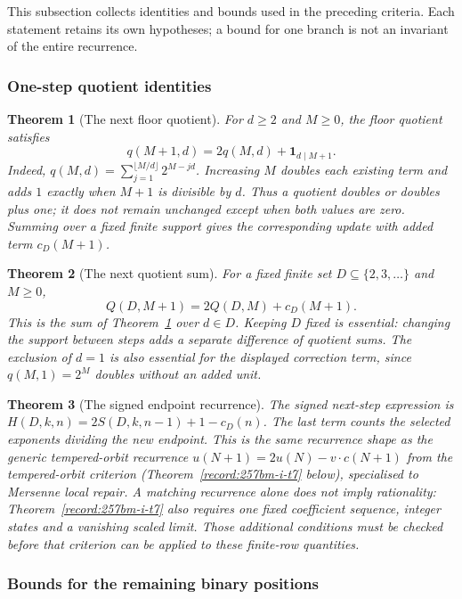 \documentclass[11pt]{article}
\theoremstyle{plain}
\newtheorem{thm}{Theorem}[section]
\theoremstyle{definition}
\theoremstyle{remark}
\begin{document}
This subsection collects identities and bounds used in the preceding
criteria.  Each statement retains its own hypotheses; a bound for one
branch is not an invariant of the entire recurrence.

\subsubsection*{One-step quotient identities}

\begin{thm}[The next floor quotient]\label{record:257bm-i1a}
For $d\ge2$ and $M\ge0$, the floor quotient satisfies
\[
 q(M+1,d)=2q(M,d)+\mathbf1_{d\mid M+1}.
\]
Indeed, $q(M,d)=\sum_{j=1}^{\lfloor M/d\rfloor}2^{M-jd}$.
Increasing $M$ doubles each existing term and adds $1$ exactly when
$M+1$ is divisible by $d$.  Thus a quotient doubles or doubles plus
one; it does not remain unchanged except when both values are zero.
Summing over a fixed finite support gives the corresponding update
with added term $c_D(M+1)$.
\end{thm}

\begin{thm}[The next quotient sum]\label{record:257bm-i1b}
For a fixed finite set $D\subseteq\{2,3,\ldots\}$ and $M\ge0$,
\[
 Q(D,M+1)=2Q(D,M)+c_D(M+1).
\]
This is the sum of Theorem~\ref{record:257bm-i1a} over $d\in D$.
Keeping $D$ fixed is essential: changing the support between steps
adds a separate difference of quotient sums.  The exclusion of
$d=1$ is also essential for the displayed correction term, since
$q(M,1)=2^M$ doubles without an added unit.
\end{thm}

\begin{thm}[The signed endpoint recurrence]\label{record:257bm-i1c}
The signed next-step expression is
$H(D,k,n)=2S(D,k,n-1)+1-c_D(n)$.  The last term counts the selected
exponents dividing the new endpoint. This is the same recurrence shape as the
generic tempered-orbit recurrence $u(N+1)=2u(N)-v\cdot c(N+1)$ from the
tempered-orbit criterion (Theorem~\ref{record:257bm-i-t7} below), specialised to Mersenne
local repair. A matching recurrence alone does not imply rationality:
Theorem~\ref{record:257bm-i-t7} also requires one fixed coefficient
sequence, integer states and a vanishing scaled limit.  Those additional
conditions must be checked before that criterion can be applied to these
finite-row quantities.
\end{thm}

\subsubsection*{Bounds for the remaining binary positions}
\end{document}
